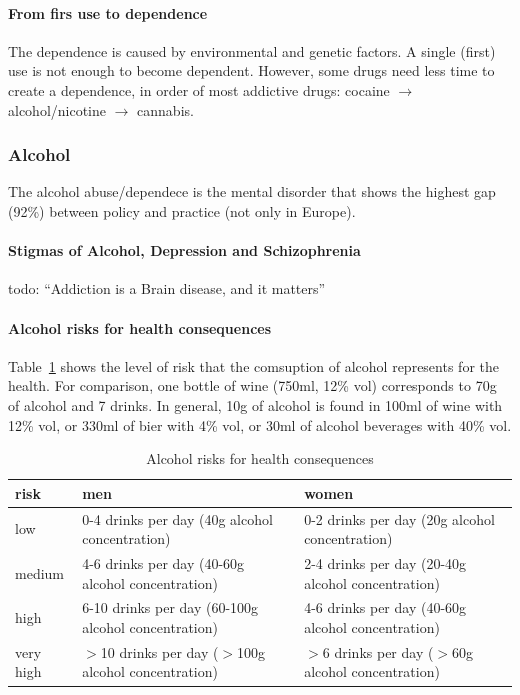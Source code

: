 \documentclass[12pt,article,oneside,a4paper]{memoir}
\begin{document}
\paragraph{From firs use to dependence} 
The dependence is caused by environmental and genetic factors. A single (first) use is not enough to become dependent.
However, some drugs need less time to create a dependence, in order of most addictive drugs: cocaine $\rightarrow$ alcohol/nicotine $\rightarrow$ cannabis.

\subsubsection{Alcohol}

The alcohol abuse/dependece is the mental disorder that shows the highest gap
(92\%) between policy and practice (not only in Europe).

\paragraph{Stigmas of Alcohol, Depression and Schizophrenia}
 todo: ``Addiction is a Brain disease, and it matters''

\paragraph{Alcohol risks for health consequences} 

Table~\ref{table:alcohol-risks} shows the level of risk that the comsuption of
alcohol represents for the health. For comparison, one bottle of wine (750ml,
12\% vol) corresponds to 70g of alcohol and 7 drinks. In general, 10g of
alcohol is found in 100ml of wine with 12\% vol, or 330ml of bier with 4\% vol,
or 30ml of alcohol beverages with 40\% vol.

\begin{table}
  \begin{tabular}{ p{4cm} | p{5cm} | p{5cm} }
    \hline
    risk & men & women \\ \hline
	\hline
    low & 0-4 drinks per day (40g alcohol concentration) & 0-2 drinks per day
    (20g alcohol concentration) \\ \hline
    medium & 4-6 drinks per day (40-60g alcohol concentration) & 2-4 drinks per
    day (20-40g alcohol concentration) \\ \hline
    high & 6-10 drinks per day (60-100g alcohol concentration) & 4-6 drinks per
    day (40-60g alcohol concentration) \\ \hline
    very high & $>$10 drinks per day ($>$100g alcohol concentration) & $>$6
    drinks per day ($>$60g alcohol concentration) \\ 
    \hline
  \end{tabular}
  \caption{Alcohol risks for health consequences}
  \label{table:alcohol-risks}
\end{table}
\end{document}
